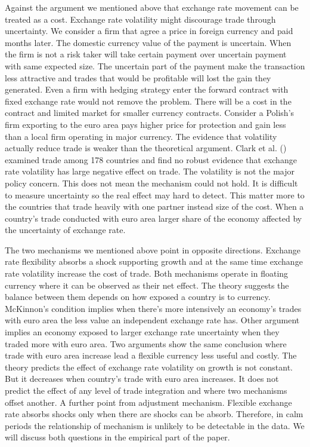 Against the argument we mentioned above that exchange rate movement can be treated as a cost.
Exchange rate volatility might discourage trade through uncertainty.
We consider a firm that agree a price in foreign currency and paid months later.
The domestic currency value of the payment is uncertain.
When the firm is not a risk taker will take certain payment over uncertain payment with same expected size.
The uncertain part of the payment make the transaction less attractive and trades that would be profitable will lost the gain they generated.
Even a firm with hedging strategy enter the forward contract with fixed exchange rate would not remove the problem.
There will be a cost in the contract and limited market for smaller currency contracts.
Consider a Polish's firm exporting to the euro area pays higher price for protection and gain less than a local firm operating in major currency.
The evidence that volatility actually reduce trade is weaker than the theoretical argument.
Clark et al. (\citeyear{clark_new_2004}) examined trade among 178 countries and find no robust evidence that exchange rate volatility has large negative effect on trade.
The volatility is not the major policy concern.
This does not mean the mechanism could not hold. 
It is difficult to measure uncertainty so the real effect may hard to detect.
This matter more to the countries that trade heavily with one partner instead size of the cost.
When a country's trade conducted with euro area larger share of the economy affected by the uncertainty of exchange rate.

\vspace{\baselineskip}

The two mechanisms we mentioned above point in opposite directions.
Exchange rate flexibility absorbs a shock supporting growth and at the same time exchange rate volatility increase the cost of trade.
Both mechanisms operate in floating currency where it can be observed as their net effect.
The theory suggests the balance between them depends on how exposed a country is to currency.
McKinnon's condition implies when there's more intensively an economy's trades with euro area the less value an independent exchange rate has.
Other argument implies an economy exposed to larger exchange rate uncertainty when they traded more with euro area.
Two arguments show the same conclusion where trade with euro area increase lead a flexible currency less useful and costly.
The theory predicts the effect of exchange rate volatility on growth is not constant.
But it decreases when country's trade with euro area increases.
It does not predict the effect of any level of trade integration and where two mechanisms offset another.
A further point from adjustment mechanism.
Flexible exchange rate absorbs shocks only when there are shocks can be absorb.
Therefore, in calm periods the relationship of mechanism is unlikely to be detectable in the data.
We will discuss both questions in the empirical part of the paper.



